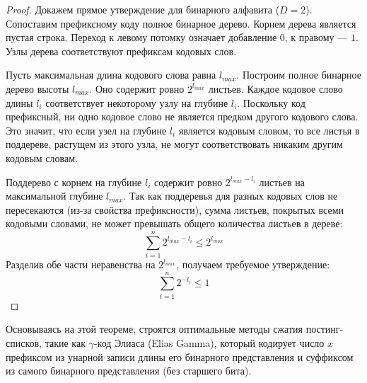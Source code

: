 \documentclass[12pt,a4paper]{article}
\begin{document}
\begin{proof}
Докажем прямое утверждение для бинарного алфавита ($D=2$).
Сопоставим префиксному коду полное бинарное дерево. Корнем дерева является пустая строка. Переход к левому потомку означает добавление $0$, к правому --- $1$. Узлы дерева соответствуют префиксам кодовых слов.

Пусть максимальная длина кодового слова равна $l_{max}$. Построим полное бинарное дерево высоты $l_{max}$. Оно содержит ровно $2^{l_{max}}$ листьев.
Каждое кодовое слово длины $l_i$ соответствует некоторому узлу на глубине $l_i$. Поскольку код префиксный, ни одно кодовое слово не является предком другого кодового слова. Это значит, что если узел на глубине $l_i$ является кодовым словом, то все листья в поддереве, растущем из этого узла, не могут соответствовать никаким другим кодовым словам.

Поддерево с корнем на глубине $l_i$ содержит ровно $2^{l_{max} - l_i}$ листьев на максимальной глубине $l_{max}$.
Так как поддеревья для разных кодовых слов не пересекаются (из-за свойства префиксности), сумма листьев, покрытых всеми кодовыми словами, не может превышать общего количества листьев в дереве:
$$ \sum_{i=1}^{n} 2^{l_{max} - l_i} \le 2^{l_{max}} $$
Разделив обе части неравенства на $2^{l_{max}}$, получаем требуемое утверждение:
$$ \sum_{i=1}^{n} 2^{-l_i} \le 1 $$
\end{proof}

Основываясь на этой теореме, строятся оптимальные методы сжатия постинг-списков, такие как $\gamma$-код Элиаса (Elias Gamma), который кодирует число $x$ префиксом из унарной записи длины его бинарного представления и суффиксом из самого бинарного представления (без старшего бита).
\end{document}
